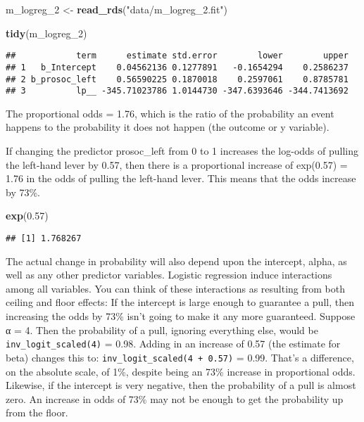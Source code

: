 \documentclass[]{article}
\newenvironment{Shaded}{\begin{snugshade}}{\end{snugshade}}
\newcommand{\KeywordTok}[1]{\textcolor[rgb]{0.13,0.29,0.53}{\textbf{#1}}}
\newcommand{\DecValTok}[1]{\textcolor[rgb]{0.00,0.00,0.81}{#1}}
\newcommand{\FloatTok}[1]{\textcolor[rgb]{0.00,0.00,0.81}{#1}}
\newcommand{\StringTok}[1]{\textcolor[rgb]{0.31,0.60,0.02}{#1}}
\newcommand{\NormalTok}[1]{#1}
\begin{document}
\begin{Shaded}
\begin{Highlighting}[]
\NormalTok{m_logreg_}\DecValTok{2}\NormalTok{ <-}\StringTok{ }\KeywordTok{read_rds}\NormalTok{(}\StringTok{"data/m_logreg_2.fit"}\NormalTok{)}
\end{Highlighting}
\end{Shaded}

\begin{Shaded}
\begin{Highlighting}[]
\KeywordTok{tidy}\NormalTok{(m_logreg_}\DecValTok{2}\NormalTok{)}
\end{Highlighting}
\end{Shaded}

\begin{verbatim}
##            term      estimate std.error        lower        upper
## 1   b_Intercept    0.04562136 0.1277891   -0.1654294    0.2586237
## 2 b_prosoc_left    0.56590225 0.1870018    0.2597061    0.8785781
## 3          lp__ -345.71023786 1.0144730 -347.6393646 -344.7413692
\end{verbatim}

The proportional odds = 1.76, which is the ratio of the probability an
event happens to the probability it does not happen (the outcome or y
variable).

If changing the predictor prosoc\_left from 0 to 1 increases the
log-odds of pulling the left-hand lever by 0.57, then there is a
proportional increase of exp(0.57) = 1.76 in the odds of pulling the
left-hand lever. This means that the odds increase by 73\%.

\begin{Shaded}
\begin{Highlighting}[]
\KeywordTok{exp}\NormalTok{(}\FloatTok{0.57}\NormalTok{)}
\end{Highlighting}
\end{Shaded}

\begin{verbatim}
## [1] 1.768267
\end{verbatim}

The actual change in probability will also depend upon the intercept,
alpha, as well as any other predictor variables. Logistic regression
induce interactions among all variables. You can think of these
interactions as resulting from both ceiling and floor effects: If the
intercept is large enough to guarantee a pull, then increasing the odds
by 73\% isn't going to make it any more guaranteed. Suppose α = 4. Then
the probability of a pull, ignoring everything else, would be
\texttt{inv\_logit\_scaled(4)} = 0.98. Adding in an increase of 0.57
(the estimate for beta) changes this to:
\texttt{inv\_logit\_scaled(4\ +\ 0.57)} = 0.99. That's a difference, on
the absolute scale, of 1\%, despite being an 73\% increase in
proportional odds. Likewise, if the intercept is very negative, then the
probability of a pull is almost zero. An increase in odds of 73\% may
not be enough to get the probability up from the floor.
\end{document}
